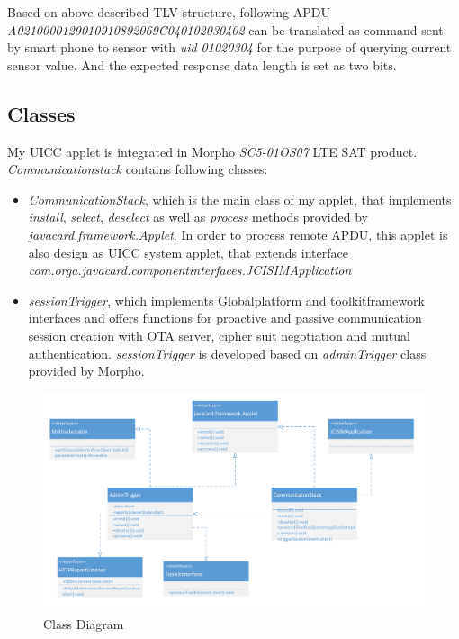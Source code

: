 Based on above described TLV structure, following APDU \emph{A0210000129010910892069C040102030402}\label{remote-apdu-example} can be translated as command sent by smart phone to sensor with \emph{uid 01020304} for the purpose of querying current sensor value. And the expected response data length is set as two bits.

\subsection{Classes}\sloppy
My UICC applet is integrated in Morpho \emph{SC5-01OS07} LTE SAT product.
\emph{Communicationstack} contains following classes:
 \begin{itemize}
  \item  \emph{CommunicationStack}, which is the main class of my applet, that implements \emph{install}, \emph{select}, \emph{deselect} as well as \emph{process} methods provided by \emph{javacard.framework.Applet}. In order to process remote APDU, this applet is also design as UICC system applet, that extends interface \emph{com.orga.javacard.componentinterfaces.JCISIMApplication}
  \item  \emph{sessionTrigger}, which implements Globalplatform  and toolkitframework interfaces and offers functions for proactive and passive communication session creation with OTA server, cipher suit negotiation and mutual authentication. \emph{sessionTrigger} is developed based on \emph{adminTrigger} class provided by Morpho.
\end{itemize}

\begin{figure}[!htbp]
	\centering
	\includegraphics[width=1.0\textwidth]{class}
		\caption{Class Diagram}
	\label{fig:class}
\end{figure}

